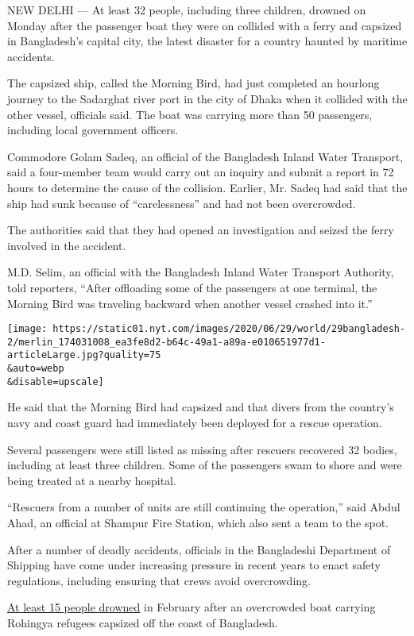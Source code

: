 NEW DELHI --- At least 32 people, including three children, drowned on
Monday after the passenger boat they were on collided with a ferry and
capsized in Bangladesh's capital city, the latest disaster for a country
haunted by maritime accidents.

The capsized ship, called the Morning Bird, had just completed an
hourlong journey to the Sadarghat river port in the city of Dhaka when
it collided with the other vessel, officials said. The boat was carrying
more than 50 passengers, including local government officers.

Commodore Golam Sadeq, an official of the Bangladesh Inland Water
Transport, said a four-member team would carry out an inquiry and submit
a report in 72 hours to determine the cause of the collision. Earlier,
Mr. Sadeq had said that the ship had sunk because of ``carelessness''
and had not been overcrowded.

The authorities said that they had opened an investigation and seized
the ferry involved in the accident.

M.D. Selim, an official with the Bangladesh Inland Water Transport
Authority, told reporters, ``After offloading some of the passengers at
one terminal, the Morning Bird was traveling backward when another
vessel crashed into it.''

\texttt{[image: https://static01.nyt.com/images/2020/06/29/world/29bangladesh-2/merlin\_174031008\_ea3fe8d2-b64c-49a1-a89a-e010651977d1-articleLarge.jpg?quality=75\\\&auto=webp\\\&disable=upscale]}

He said that the Morning Bird had capsized and that divers from the
country's navy and coast guard had immediately been deployed for a
rescue operation.

Several passengers were still listed as missing after rescuers recovered
32 bodies, including at least three children. Some of the passengers
swam to shore and were being treated at a nearby hospital.

``Rescuers from a number of units are still continuing the operation,''
said Abdul Ahad, an official at Shampur Fire Station, which also sent a
team to the spot.

After a number of deadly accidents, officials in the Bangladeshi
Department of Shipping have come under increasing pressure in recent
years to enact safety regulations, including ensuring that crews avoid
overcrowding.

\href{https://www.nytimes.com/2020/02/11/world/asia/rohingya-refugees-boat-bangladesh.html}{At
least 15 people drowned} in February after an overcrowded boat carrying
Rohingya refugees capsized off the coast of Bangladesh.

